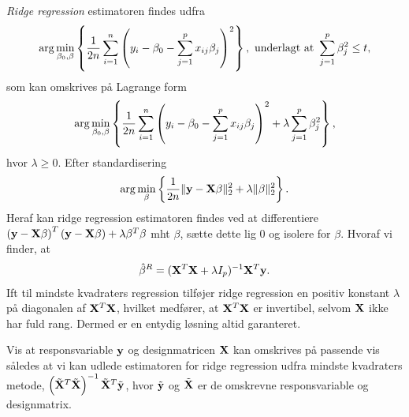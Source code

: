 \textit{Ridge regression} estimatoren findes udfra 
\begin{align} 
\arg \min_{\beta_0, \beta} \cbr{\frac{1}{2n} \sum_{i=1}^n \del{y_i - \beta_0 - \sum_{j=1}^p x_{ij} \beta_j}^2}, \ \text{underlagt at } \sum_{j=1}^p \beta_j^2 \leq t, \label{eq:2.7} 
\end{align} 
som kan omskrives på Lagrange form
\begin{align} 
\arg \min_{\beta_0, \beta} \cbr{\frac{1}{2n} \sum_{i=1}^n \del{y_i - \beta_0 - \sum_{j=1}^p x_{ij} \beta_j}^2 + \lambda \sum_{j=1}^p \beta_j^2}, 
\end{align} \label{eq:2.8} 
hvor $\lambda \geq 0$.
Efter standardisering
\begin{align*}
\arg \min_{\beta} \cbr{\frac{1}{2n} \Vert \y - \X \beta \Vert_2^2 + \lambda \Vert \beta \Vert_2^2}.
\end{align*}
Heraf kan ridge regression estimatoren findes ved at differentiere \(\del{\y - \X \beta}^T \del{\y - \X \beta} + \lambda \beta^T \beta\) mht $\beta$, sætte dette lig 0 og isolere for $\beta$. Hvoraf vi finder, at
\begin{align*} 
\hat{\beta}^R = (\mathbf{X}^T \mathbf{X} + \lambda I_p)^{-1} \mathbf{X}^T \mathbf{y}. 
\end{align*}  
Ift til mindste kvadraters regression tilføjer ridge regression en positiv konstant $\lambda$ på diagonalen af $\mathbf{X}^T \mathbf{X}$, hvilket medfører, at \(\mathbf{X}^T \mathbf{X}\) er invertibel, selvom $\mathbf{X}$ ikke har fuld rang. 
Dermed er en entydig løsning altid garanteret. 
%
\begin{exmp}
Vis at responsvariable \(\mathbf{y}\) og designmatricen \(\mathbf{X}\) kan omskrives på passende vis således at vi kan udlede estimatoren for ridge regression udfra mindste kvadraters metode, \(\del{\tilde{\X}^T \tilde{\X}}^{-1} \tilde{\X}^T \tilde{\y}\), hvor \(\tilde{\mathbf{y}}\) og \(\tilde{\mathbf{X}}\) er de omskrevne responsvariable og designmatrix.
\end{exmp} 
%
